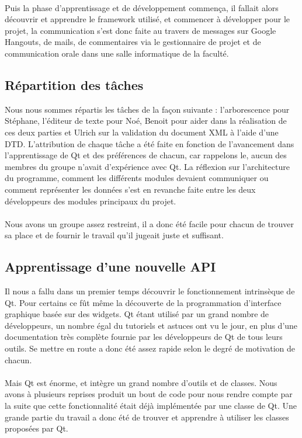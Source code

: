 \paragraph{}

Puis la phase d'apprentissage et de développement commença, il fallait alors découvrir et apprendre le framework utilisé, et commencer à développer pour le projet, la communication s'est donc faite au travers de messages sur Google Hangouts, de mails, de commentaires via le gestionnaire de projet et de communication orale dans une salle informatique de la faculté.
        
\subsection{Répartition des tâches}
Nous nous sommes répartis les tâches de la façon suivante : l'arborescence pour Stéphane, l'éditeur de texte pour Noé, Benoit pour aider dans la réalisation de ces deux parties et Ulrich sur la validation du document XML à l'aide d'une DTD. L'attribution de chaque tâche a été faite en fonction de l'avancement dans l'apprentissage de Qt et des préférences de chacun, car rappelons le, aucun des membres du groupe n'avait d'expérience avec Qt. La réflexion sur l'architecture du programme, comment les différents modules devaient communiquer ou comment représenter les données s'est en revanche faite entre les deux développeurs des modules principaux du projet.
\paragraph{}
Nous avons un groupe assez restreint, il a donc été facile pour chacun de trouver sa place et de fournir le travail qu'il jugeait juste et suffisant.

\subsection{Apprentissage d'une nouvelle API}
Il nous a fallu dans un premier temps découvrir le fonctionnement intrinsèque de Qt. Pour certains ce fût même la découverte de la programmation d'interface graphique basée sur des widgets. Qt étant utilisé par un grand nombre de développeurs, un nombre égal du tutoriels et astuces ont vu le jour, en plus d'une documentation très complète fournie par les développeurs de Qt de tous leurs outils. Se mettre en route a donc été assez rapide selon le degré de motivation de chacun.
\paragraph{}
Mais Qt est énorme, et intègre un grand nombre d'outils et de classes. Nous avons à plusieurs reprises produit un bout de code pour nous rendre compte par la suite que cette fonctionnalité était déjà implémentée par une classe de Qt. Une grande partie du travail a donc été de trouver et apprendre à utiliser les classes proposées par Qt.
